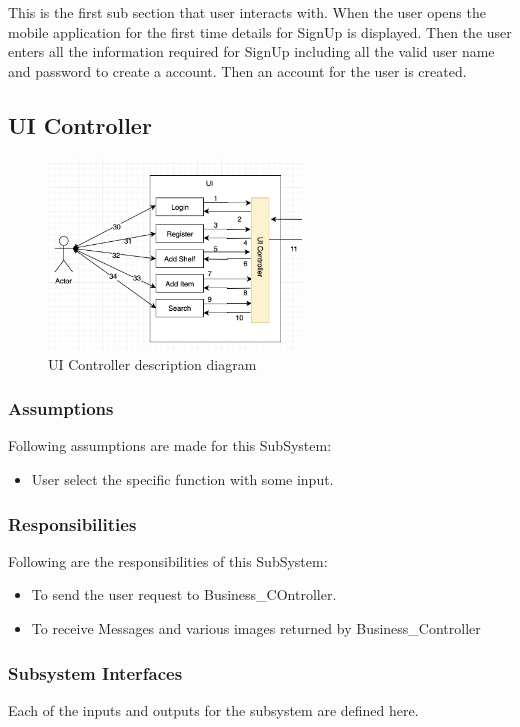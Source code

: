 This is the first sub section that user interacts with. When the user opens the mobile application for the first time details for SignUp is displayed. Then the user enters all the information required for SignUp including all the valid user name and password to create a account. Then an account for the user is created.

\subsection{UI Controller}


\begin{figure}[h!]
	\centering
 	\includegraphics[width=0.60\textwidth]{images/uicontroller}
 \caption{UI Controller description diagram}
\end{figure}

\subsubsection{Assumptions}
Following assumptions are made for this SubSystem:
\begin{itemize}
    \item User select the specific function with some input.
\end{itemize}

\subsubsection{Responsibilities}
Following are the responsibilities of this SubSystem:
\begin{itemize}
    \item To send the user request to Business\_COntroller.
    \item To receive Messages and various images returned by Business\_Controller 
\end{itemize}

\subsubsection{Subsystem Interfaces}
Each of the inputs and outputs for the subsystem are defined here.

